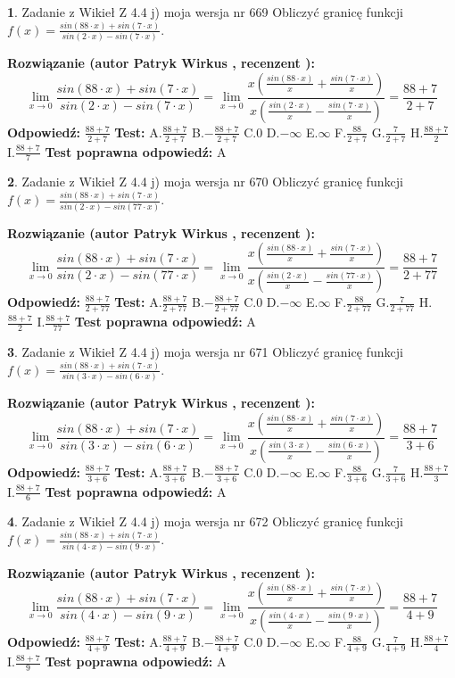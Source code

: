\documentclass[12pt, a4paper]{article}
\theoremstyle{definition} %
\newtheorem{zad}{}
\newcommand{\zadStart}[1]{\begin{zad}#1\newline}
\newcommand{\zadStop}{\end{zad}}
\newcommand{\rozwStart}[2]{\noindent \textbf{Rozwiązanie (autor #1 , recenzent #2): }\newline}
\newcommand{\rozwStop}{\newline}
\newcommand{\odpStart}{\noindent \textbf{Odpowiedź:}\newline}
\newcommand{\odpStop}{\newline}
\newcommand{\testStart}{\noindent \textbf{Test:}\newline}
\newcommand{\testStop}{\newline}
\newcommand{\kluczStart}{\noindent \textbf{Test poprawna odpowiedź:}\newline}
\newcommand{\kluczStop}{\newline}
\begin{document}
\zadStart{Zadanie z Wikieł Z 4.4 j) moja wersja nr 669}
Obliczyć granicę funkcji $f(x)=\frac{sin(88\cdot x) +sin(7\cdot x)}{sin(2\cdot x) -sin(7\cdot x)}$.
\zadStop
\rozwStart{Patryk Wirkus}{}
$$\lim\limits_{x\to 0}\frac{sin(88\cdot x) +sin(7\cdot x)}{sin(2\cdot x) -sin(7\cdot x)}=\lim\limits_{x\to 0}\frac{x(\frac{sin(88\cdot x)}{x}+\frac{sin(7\cdot x)}{x})}{x(\frac{sin(2\cdot x)}{x}-\frac{sin(7\cdot x)}{x})}=\frac{88+7}{2+7}$$
\rozwStop
\odpStart
$\frac{88+7}{2+7}$
\odpStop
\testStart
A.$\frac{88+7}{2+7}$
B.$-\frac{88+7}{2+7}$
C.$0$
D.$-\infty$
E.$\infty$
F.$\frac{88}{2+7}$
G.$\frac{7}{2+7}$
H.$\frac{88+7}{2}$
I.$\frac{88+7}{7}$
\testStop
\kluczStart
A
\kluczStop



\zadStart{Zadanie z Wikieł Z 4.4 j) moja wersja nr 670}
Obliczyć granicę funkcji $f(x)=\frac{sin(88\cdot x) +sin(7\cdot x)}{sin(2\cdot x) -sin(77\cdot x)}$.
\zadStop
\rozwStart{Patryk Wirkus}{}
$$\lim\limits_{x\to 0}\frac{sin(88\cdot x) +sin(7\cdot x)}{sin(2\cdot x) -sin(77\cdot x)}=\lim\limits_{x\to 0}\frac{x(\frac{sin(88\cdot x)}{x}+\frac{sin(7\cdot x)}{x})}{x(\frac{sin(2\cdot x)}{x}-\frac{sin(77\cdot x)}{x})}=\frac{88+7}{2+77}$$
\rozwStop
\odpStart
$\frac{88+7}{2+77}$
\odpStop
\testStart
A.$\frac{88+7}{2+77}$
B.$-\frac{88+7}{2+77}$
C.$0$
D.$-\infty$
E.$\infty$
F.$\frac{88}{2+77}$
G.$\frac{7}{2+77}$
H.$\frac{88+7}{2}$
I.$\frac{88+7}{77}$
\testStop
\kluczStart
A
\kluczStop



\zadStart{Zadanie z Wikieł Z 4.4 j) moja wersja nr 671}
Obliczyć granicę funkcji $f(x)=\frac{sin(88\cdot x) +sin(7\cdot x)}{sin(3\cdot x) -sin(6\cdot x)}$.
\zadStop
\rozwStart{Patryk Wirkus}{}
$$\lim\limits_{x\to 0}\frac{sin(88\cdot x) +sin(7\cdot x)}{sin(3\cdot x) -sin(6\cdot x)}=\lim\limits_{x\to 0}\frac{x(\frac{sin(88\cdot x)}{x}+\frac{sin(7\cdot x)}{x})}{x(\frac{sin(3\cdot x)}{x}-\frac{sin(6\cdot x)}{x})}=\frac{88+7}{3+6}$$
\rozwStop
\odpStart
$\frac{88+7}{3+6}$
\odpStop
\testStart
A.$\frac{88+7}{3+6}$
B.$-\frac{88+7}{3+6}$
C.$0$
D.$-\infty$
E.$\infty$
F.$\frac{88}{3+6}$
G.$\frac{7}{3+6}$
H.$\frac{88+7}{3}$
I.$\frac{88+7}{6}$
\testStop
\kluczStart
A
\kluczStop



\zadStart{Zadanie z Wikieł Z 4.4 j) moja wersja nr 672}
Obliczyć granicę funkcji $f(x)=\frac{sin(88\cdot x) +sin(7\cdot x)}{sin(4\cdot x) -sin(9\cdot x)}$.
\zadStop
\rozwStart{Patryk Wirkus}{}
$$\lim\limits_{x\to 0}\frac{sin(88\cdot x) +sin(7\cdot x)}{sin(4\cdot x) -sin(9\cdot x)}=\lim\limits_{x\to 0}\frac{x(\frac{sin(88\cdot x)}{x}+\frac{sin(7\cdot x)}{x})}{x(\frac{sin(4\cdot x)}{x}-\frac{sin(9\cdot x)}{x})}=\frac{88+7}{4+9}$$
\rozwStop
\odpStart
$\frac{88+7}{4+9}$
\odpStop
\testStart
A.$\frac{88+7}{4+9}$
B.$-\frac{88+7}{4+9}$
C.$0$
D.$-\infty$
E.$\infty$
F.$\frac{88}{4+9}$
G.$\frac{7}{4+9}$
H.$\frac{88+7}{4}$
I.$\frac{88+7}{9}$
\testStop
\kluczStart
A
\kluczStop
\end{document}
